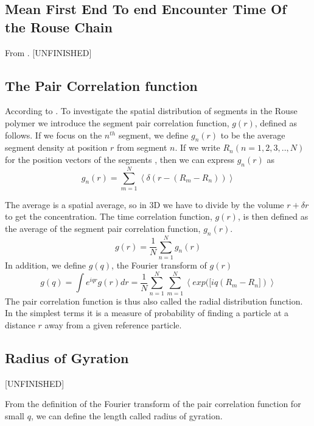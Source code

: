 \documentclass{report}
\begin{document}
\subsection{Mean First End To end Encounter Time Of the Rouse Chain}\label{subsection_meanEndToEndEncounterTimeOfTheRouseChain}
From \cite{amitai2012computation}. [UNFINISHED]

\subsection{The Pair Correlation function}\label{subsection_thePairCorrelationFunction}
According to \cite{doi1996introduction}. To investigate the spatial distribution of segments in the Rouse polymer we introduce the segment pair correlation function, $g(r)$, defined as follows. If we focus on the $n^{th}$ segment, we define $g_n(r)$ to be the average segment density at position $r$ from segment $n$. If we write $R_n(n=1,2,3,..,N)$ for the position vectors of the segments , then we can express $g_n(r)$ as 
\begin{equation*}
g_n(r)=\sum_{m=1}^N \left<\delta(r-(R_m-R_n)) \right>
\end{equation*} 

The average is a spatial average, so in 3D we have to divide by the volume $r+\delta r$ to get the concentration. The time correlation function, $g(r)$, is then defined as the average of the segment pair correlation function, $g_n(r)$. 
\begin{equation*}
g(r) = \frac{1}{N}\sum_{n=1}^{N}g_n(r)
\end{equation*}
In addition, we define $g(q)$, the Fourier transform of $g(r)$
\begin{equation*}
g(q) = \int e^{iqr}g(r)dr = \frac{1}{N}\sum\limits_{n=1}^{N}\sum\limits_{m=1}^{N}\left<exp([iq(R_m-R_n]) \right>
\end{equation*}
The pair correlation function is thus also called the radial distribution function. In the simplest terms it is a measure of probability of finding a particle at a distance $r$ away from a given reference particle. 


\subsection{Radius of Gyration}\label{subsection_radiusOfGyration}
[UNFINISHED]

From the definition of the Fourier transform of the pair correlation function for small $q$, we can define the length called radius of gyration. 
\end{document}
